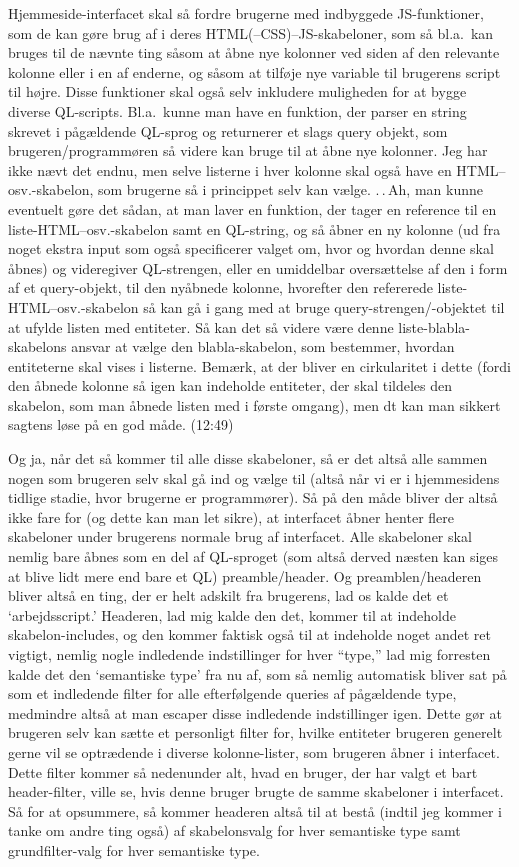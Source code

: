 \documentclass{report}
\begin{document}
Hjemmeside-interfacet skal så fordre brugerne med indbyggede JS-funktioner, som de kan gøre brug af i deres HTML(--CSS)--JS-skabeloner, som så bl.a.\ kan bruges til de nævnte ting såsom at åbne nye kolonner ved siden af den relevante kolonne eller i en af enderne, og såsom at tilføje nye variable til brugerens script til højre. Disse funktioner skal også selv inkludere muligheden for at bygge diverse QL-scripts. Bl.a.\ kunne man have en funktion, der parser en string skrevet i pågældende QL-sprog og returnerer et slags query objekt, som brugeren/programmøren så videre kan bruge til at åbne nye kolonner. Jeg har ikke nævt det endnu, men selve listerne i hver kolonne skal også have en HTML--osv.-skabelon, som brugerne så i princippet selv kan vælge. .\,.\,Ah, man kunne eventuelt gøre det sådan, at man laver en funktion, der tager en reference til en liste-HTML--osv.-skabelon samt en QL-string, og så åbner en ny kolonne (ud fra noget ekstra input som også specificerer valget om, hvor og hvordan denne skal åbnes) og videregiver QL-strengen, eller en umiddelbar oversættelse af den i form af et query-objekt, til den nyåbnede kolonne, hvorefter den refererede liste-HTML--osv.-skabelon så kan gå i gang med at bruge query-strengen/-objektet til at ufylde listen med entiteter. Så kan det så videre være denne liste-blabla-skabelons ansvar at vælge den blabla-skabelon, som bestemmer, hvordan entiteterne skal vises i listerne. Bemærk, at der bliver en cirkularitet i dette (fordi den åbnede kolonne så igen kan indeholde entiteter, der skal tildeles den skabelon, som man åbnede listen med i første omgang), men dt kan man sikkert sagtens løse på en god måde. (12:49)

Og ja, når det så kommer til alle disse skabeloner, så er det altså alle sammen nogen som brugeren selv skal gå ind og vælge til (altså når vi er i hjemmesidens tidlige stadie, hvor brugerne er programmører). Så på den måde bliver der altså ikke fare for (og dette kan man let sikre), at interfacet åbner henter flere skabeloner under brugerens normale brug af interfacet. Alle skabeloner skal nemlig bare åbnes som en del af QL-sproget (som altså derved næsten kan siges at blive lidt mere end bare et QL) preamble/header. Og preamblen/headeren bliver altså en ting, der er helt adskilt fra brugerens, lad os kalde det et `arbejdsscript.' Headeren, lad mig kalde den det, kommer til at indeholde skabelon-includes, og den kommer faktisk også til at indeholde noget andet ret vigtigt, nemlig nogle indledende indstillinger for hver ``type,'' lad mig forresten kalde det den `semantiske type' fra nu af, som så nemlig automatisk bliver sat på som et indledende filter for alle efterfølgende queries af pågældende type, medmindre altså at man escaper disse indledende indstillinger igen. Dette gør at brugeren selv kan sætte et personligt filter for, hvilke entiteter brugeren generelt gerne vil se optrædende i diverse kolonne-lister, som brugeren åbner i interfacet. Dette filter kommer så nedenunder alt, hvad en bruger, der har valgt et bart header-filter, ville se, hvis denne bruger brugte de samme skabeloner i interfacet. Så for at opsummere, så kommer headeren altså til at bestå (indtil jeg kommer i tanke om andre ting også) af skabelonsvalg for hver semantiske type samt grundfilter-valg for hver semantiske type. 
\end{document}
